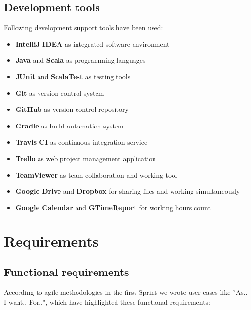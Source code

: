 \documentclass[a4paper,12pt]{report}
\begin{document}
\section{Development tools}
Following development support tools have been used:

\begin{itemize}
\item \textbf{IntelliJ IDEA} as integrated software environment
\item \textbf{Java} and \textbf{Scala} as programming languages
\item \textbf{JUnit} and \textbf{ScalaTest} as testing tools
\item \textbf{Git} as version control system
\item \textbf{GitHub} as version control repository
\item \textbf{Gradle} as build automation system
\item \textbf{Travis CI} as continuous integration service
\item \textbf{Trello} as web project management application
\item \textbf{TeamViewer} as team collaboration and working tool
\item \textbf{Google Drive} and \textbf{Dropbox} for sharing files and working simultaneously
\item \textbf{Google Calendar} and \textbf{GTimeReport} for working hours count
\end{itemize}

\chapter{Requirements}

\section{Functional requirements}

According to agile methodologies in the first Sprint we wrote user cases like ``As.. I want.. For..", which have highlighted these functional requirements:
\end{document}
